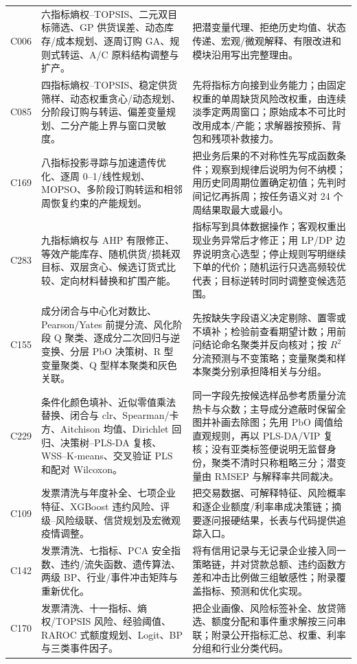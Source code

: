 \begin{longtable}{p{1.4cm}p{5.2cm}p{7.0cm}}
C006 & 六指标熵权--TOPSIS、二元双目标筛选、GP 供货误差、动态库存/成本规划、逐周订购 GA、规则式转运、A/C 原料结构调整与扩产。 &
把潜变量代理、拒绝历史均值、状态传递、宏观/微观解释、有限改进和模块沿用写出完整理由。\\
C085 & 四指标熵权--TOPSIS、稳定供货筛样、动态权重贪心/动态规划、分阶段订购与转运、偏差变量规划、二分产能上界与窗口灵敏度。 &
先将指标方向接到业务能力；由固定权重的单周缺货风险改权重，由连续淡季定两周窗口；原始成本不可比时改用成本/产能；求解器按预拆、背包和残项补救接力。\\
C169 & 八指标投影寻踪与加速遗传优化、逐周 0--1/线性规划、MOPSO、多阶段订购转运和相邻周恢复约束的产能规划。 &
把业务后果的不对称性先写成函数条件；观察到规律后说明为何不纳模；用历史同周期位置确定初值；先判时间记忆再拆周；按任务语义对 24 个周结果取最大或最小。\\
C283 & 九指标熵权与 AHP 有限修正、等效产能库存、随机供货/损耗双目标、双层贪心、候选订货式比较、定向材料替换和扩围产能。 &
指标写到具体数据操作；客观权重出现业务异常后才修正；用 LP/DP 边界说明贪心选型；停止规则写明继续下单的代价；随机运行只选高频较优代表；目标逆转时同时调整变候选范围。\\
C155 & 成分闭合与中心化对数比、Pearson/Yates 前提分流、风化阶段 Q 聚类、逐成分二次回归与逆变换、分层 PbO 决策树、R 型变量聚类、Q 型样本聚类和灰色关联。 &
先按缺失字段语义决定剔除、置零或不填补；检验前查看期望计数；用前问结论命名聚类并反向核对；按 $R^2$ 分流预测与不变策略；变量聚类和样本聚类分别承担降相关与分组。\\
C229 & 条件化颜色填补、近似零值乘法替换、闭合与 clr、Spearman/卡方、Aitchison 均值、Dirichlet 回归、决策树--PLS-DA 复核、WSS--K-means、交叉验证 PLS 和配对 Wilcoxon。 &
同一字段先按候选样品参考质量分流热卡与众数；主导成分遮蔽时保留全图并补画去除图；先用 PbO 阈值给直观规则，再以 PLS-DA/VIP 复核；没有亚类标签便说明无监督身份，聚类不清时只称粗略三分；潜变量由 RMSEP 与解释率共同裁决。\\
C109 & 发票清洗与年度补全、七项企业特征、XGBoost 违约风险、评级--风险级联、信贷规划及宏微观疫情调整。 &
把交易数据、可解释特征、风险概率和逐企业额度/利率串成决策链；摘要逐问报硬结果，长表与代码提供追踪入口。\\
C142 & 发票清洗、七指标、PCA 安全指数、违约/流失函数、遗传算法、两级 BP、行业/事件冲击矩阵与重新优化。 &
将有信用记录与无记录企业接入同一策略链，并对贷款总额、违约函数方差和冲击比例做三组敏感性；附录覆盖指标、预测和优化实现。\\
C170 & 发票清洗、十一指标、熵权/TOPSIS 风险、经验阈值、RAROC 式额度规划、Logit、BP 与三类事件因子。 &
把企业画像、风险标签补全、放贷筛选、额度分配和事件重求解按三问串联；附录公开指标汇总、权重、利率分组和行业分类代码。\\

\end{longtable}
